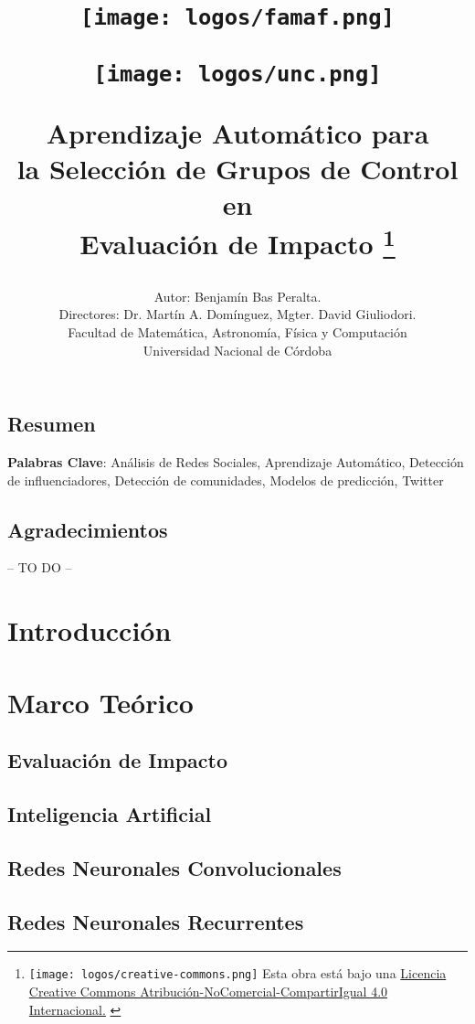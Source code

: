\documentclass[a4paper,12pt,spanish]{book}
\title{
    \begin{minipage}{0.4\textwidth}
        \centering
        \texttt{[image: logos/famaf.png]}
    \end{minipage}
    \hfill
    \begin{minipage}{0.4\textwidth}
        \centering
        \texttt{[image: logos/unc.png]}
    \end{minipage}
    
    \textbf{
        Aprendizaje Automático para \\
        la Selección de Grupos de Control en \\
        Evaluación de Impacto
    } 
    \thanks{
        {
        {\protect\texttt{[image: logos/creative-commons.png]}} \fontsize{10}{11}\selectfont  Esta obra está bajo una \href{https://creativecommons.org/licenses/by-nc-sa/4.0/}{Licencia Creative Commons Atribución-NoComercial-CompartirIgual 4.0 Internacional.}
        }
    }
}
\author{
    Autor: Benjam\'in Bas Peralta.\\
    Directores: Dr. Martín A. Domínguez, Mgter. David Giuliodori.\\ 
    Facultad de Matemática, Astronomía, Física y Computación\\
    Universidad Nacional de Córdoba
}
\begin{document}
\maketitle
\cleardoublepage

\section*{Resumen}

\bigskip
\textbf{Palabras Clave}: Análisis de Redes Sociales, Aprendizaje Automático, Detección de influenciadores, Detección de comunidades, Modelos de predicción, Twitter
\clearpage

\thispagestyle{empty}
\section*{Agradecimientos}
-- TO DO --
\clearpage

\tableofcontents
\clearpage

\chapter{Introducción}


\chapter{Marco Teórico}

\section{Evaluación de Impacto}


\section{Inteligencia Artificial}


\section{Redes Neuronales Convolucionales}


\section{Redes Neuronales Recurrentes}

\end{document}
